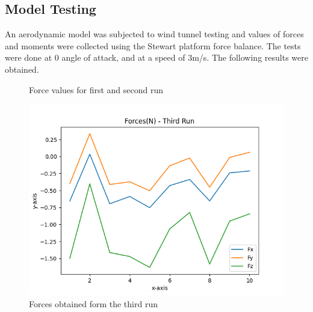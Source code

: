 \subsection{Model Testing}
An aerodynamic model was subjected to wind tunnel testing and values of forces and moments were collected
using the Stewart platform force balance. The tests were done at 0 angle of attack, and at a speed of 3m/s.
The following results were obtained.
\begin{figure}[!htb]%
	\centering
	\qquad
	\caption[Force values for first and second run]{Force values for first and second run}%
	\label{fig:result1}%
\end{figure}
\begin{center}
	\begin{figure}[H]
		\centering
		\includegraphics[width=0.7\linewidth]{Figures/Forces third run.png}
		\caption[Forces Third run]{Forces obtained form the third run}
		\label{fig:pcb_fab}
	\end{figure}
\end{center}
